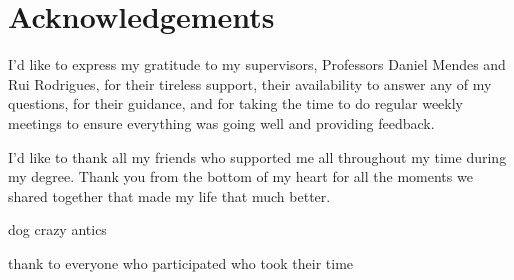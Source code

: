 \chapter*{Acknowledgements}

I'd like to express my gratitude to my supervisors, Professors Daniel Mendes and Rui Rodrigues, for their tireless support, their availability to answer any of my questions, for their guidance, and for taking the time to do regular weekly meetings to ensure everything was going well and providing feedback.

I'd like to thank all my friends who supported me all throughout my time during my degree. Thank you from the bottom of my heart for all the moments we shared together that made my life that much better.

dog crazy antics

thank to everyone who participated who took their time

\vspace{10mm}
